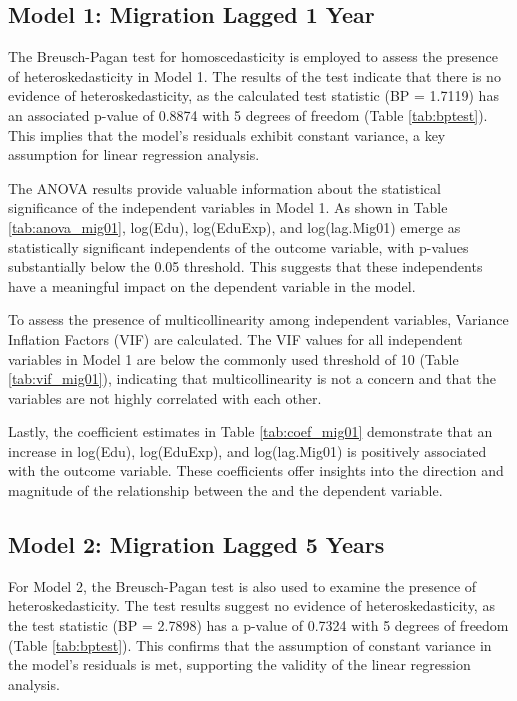\documentclass[12pt]{article}
\begin{document}
\subsection{Model 1: Migration Lagged 1 Year} \label{results-model1}

The Breusch-Pagan test for homoscedasticity is employed to assess the presence of heteroskedasticity in Model 1.
The results of the test indicate that there is no evidence of heteroskedasticity, as the calculated test statistic (BP = 1.7119) has an associated p-value of 0.8874 with 5 degrees of freedom (Table \ref{tab:bptest}).
This implies that the model's residuals exhibit constant variance, a key assumption for linear regression analysis.

The ANOVA results provide valuable information about the statistical significance of the independent variables in Model 1.
As shown in Table \ref{tab:anova_mig01}, log(Edu), log(EduExp), and log(lag.Mig01) emerge as statistically significant independents of the outcome variable, with p-values substantially below the 0.05 threshold.
This suggests that these independents have a meaningful impact on the dependent variable in the model.

To assess the presence of multicollinearity among independent variables, Variance Inflation Factors (VIF) are calculated.
The VIF values for all independent variables in Model 1 are below the commonly used threshold of 10 (Table \ref{tab:vif_mig01}), indicating that multicollinearity is not a concern and that the variables are not highly correlated with each other.

Lastly, the coefficient estimates in Table \ref{tab:coef_mig01} demonstrate that an increase in log(Edu), log(EduExp), and log(lag.Mig01) is positively associated with the outcome variable.
These coefficients offer insights into the direction and magnitude of the relationship between the and the dependent variable.

\subsection{Model 2: Migration Lagged 5 Years} \label{results-model2}

For Model 2, the Breusch-Pagan test is also used to examine the presence of heteroskedasticity. The test results suggest no evidence of heteroskedasticity, as the test statistic (BP = 2.7898) has a p-value of 0.7324 with 5 degrees of freedom (Table \ref{tab:bptest}).
This confirms that the assumption of constant variance in the model's residuals is met, supporting the validity of the linear regression analysis.
\end{document}
